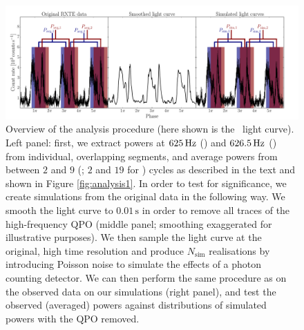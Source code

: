 \documentclass{emulateapj}
\begin{document}
\begin{figure}[htbp]
\begin{center}
\includegraphics[width=18cm]{f3.pdf}
\caption{Overview of the analysis procedure (here shown is the \rxte\ light curve). Left panel: first, we extract powers at $625\,\mathrm{Hz}$ (\rxte) and $626.5\,\mathrm{Hz}$ (\rhessi) from individual, overlapping segments, and average powers from between $2$ and $9$ (\rxte; $2$ and $19$ for \rhessi) cycles as described in the text and shown in Figure \ref{fig:analysis1}. In order to test for significance, we create simulations from the original data in the following way. We smooth the light curve to $0.01\,\mathrm{s}$ in order to remove all traces of the high-frequency QPO (middle panel; smoothing exaggerated for illustrative purposes). We then sample the light curve at the original, high time resolution and produce $N_\mathrm{sim}$ realisations by introducing Poisson noise to simulate the effects of a photon counting detector. We can then perform the same procedure as on the observed data on our simulations (right panel), and test the observed (averaged) powers against distributions of simulated powers with the QPO removed.}
\label{fig:analysis2}
\end{center}
\end{figure}
\end{document}
